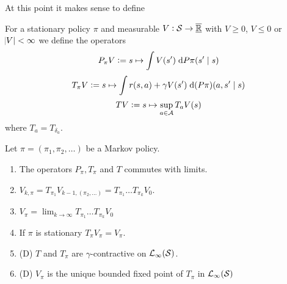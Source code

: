 
At this point it makes sense to define

\begin{defn}
  For a stationary policy $\pi$ and measurable $V:\mathcal{S} \to \overline{\underline{\mathbb{R}}}$
  with $V \geq 0$, $V \leq 0$ or $\abs{V} < \infty$
  we define the operators 
  \[ P_\pi V \vcentcolon= s \mapsto \int V(s') \; \mathrm{d} P\pi(s' \mid s) \]
  \[ T_\pi V \vcentcolon= s \mapsto \int r(s, a)
  + \gamma V(s') \; \mathrm{d} (P \pi)(a, s'\mid s) \]
  \[ T V \vcentcolon= s \mapsto \sup_{a \in \mathcal{A}} T_a V(s) \]
  where $T_a = T_{\delta_a}$.
\end{defn}

\begin{prop}
  Let $\pi = (\pi_1, \pi_2, \dots)$ be a Markov policy.
  \begin{enumerate}
    \item The operators $P_\pi, T_\pi$ and $T$ commutes with limits.
    \item $V_{k, \pi} = T_{\pi_1} V_{k-1, (\pi_2, \dots)}
      = T_{\pi_1} \dots T_{\pi_k} V_0$.
    \item $V_\pi = \lim_{k \to \infty} T_{\pi_1} \dots T_{\pi_k} V_0$
    \item If $\pi$ is stationary $T_\pi V_\pi = V_\pi$.
    \item (D) $T$ and $T_\pi$ are $\gamma$-contractive
      on $\mathcal{L}_\infty(\mathcal{S})$.
    \item (D) $V_\pi$ is the unique bounded fixed point of $T_\pi$
      in $\mathcal{L}_\infty(\mathcal{S})$
  \end{enumerate} 
  \label{prop:propTV}
\end{prop}
